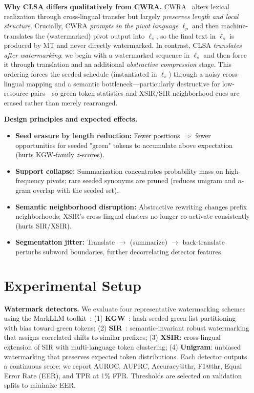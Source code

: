\documentclass{article}
\begin{document}
\textbf{Why CLSA differs qualitatively from CWRA.}
CWRA~\citep{He2024cwra} alters lexical realization through cross-lingual transfer but largely \emph{preserves length and local structure}. Crucially, CWRA \emph{prompts in the pivot language} $\ell_p$ and then machine-translates the (watermarked) pivot output into $\ell_s$, so the final text in $\ell_s$ is produced by MT and never directly watermarked. In contrast, CLSA \emph{translates after watermarking}: we begin with a watermarked sequence in $\ell_s$ and then force it through translation and an additional \emph{abstractive compression} stage. This ordering forces the seeded schedule (instantiated in $\ell_s$) through a noisy cross-lingual mapping and a semantic bottleneck—particularly destructive for low-resource pairs—so green-token statistics and XSIR/SIR neighborhood cues are erased rather than merely rearranged.

\textbf{Design principles and expected effects.}
\begin{itemize}
    \item \textbf{Seed erasure by length reduction:} Fewer positions $\Rightarrow$ fewer opportunities for seeded "green" tokens to accumulate above expectation (hurts KGW-family $z$-scores).
    \item \textbf{Support collapse:} Summarization concentrates probability mass on high-frequency pivots; rare seeded synonyms are pruned (reduces unigram and $n$-gram overlap with the seeded set).
    \item \textbf{Semantic neighborhood disruption:} Abstractive rewriting changes prefix neighborhoods; XSIR's cross-lingual clusters no longer co-activate consistently (hurts SIR/XSIR).
    \item \textbf{Segmentation jitter:} Translate $\rightarrow$ (summarize) $\rightarrow$ back-translate perturbs subword boundaries, further decorrelating detector features.
\end{itemize}

\section{Experimental Setup}

\textbf{Watermark detectors.} We evaluate four representative watermarking schemes using the MarkLLM toolkit~\citep{pan2024marklllm}: (1) \textbf{KGW}~\citep{kirchenbauer2023watermark}: hash-seeded green-list partitioning with bias toward green tokens; (2) \textbf{SIR}~\citep{liu2024sir}: semantic-invariant robust watermarking that assigns correlated shifts to similar prefixes; (3) \textbf{XSIR}: cross-lingual extension of SIR with multi-language token clustering; (4) \textbf{Unigram}: unbiased watermarking that preserves expected token distributions. Each detector outputs a continuous score; we report AUROC, AUPRC, Accuracy@thr, F1@thr, Equal Error Rate (EER), and TPR at 1\% FPR. Thresholds are selected on validation splits to minimize EER.
\end{document}
